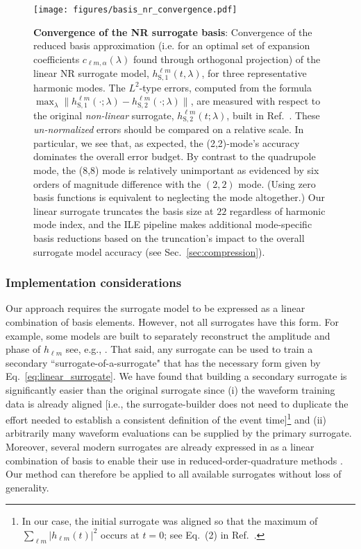\documentclass[aps,prd,nofootinbib,showpacs,amssymb,twocolumn]{revtex4}
\begin{document}
\begin{figure}
\texttt{[image: figures/basis\_nr\_convergence.pdf]}
\caption{\label{fig:basis_convergences}\textbf{Convergence of the NR surrogate basis}: Convergence of the reduced basis approximation (i.e. for an optimal set of expansion coefficients $c_{\ell m, \alpha}(\lambda)$ found through orthogonal projection)
of the linear NR surrogate model, $h^{\ell m}_\mathrm{S,1}(t,\lambda)$, for 
three representative harmonic modes. 
The $L^2$-type errors, computed from the formula $\max_{\lambda} \| h^{\ell m}_\mathrm{S,1}(\cdot; \lambda) - h^{\ell m}_\mathrm{S,2}(\cdot; \lambda)\|$, are measured with respect to the original {\em non-linear} surrogate, $h^{\ell m}_\mathrm{S,2}(t;\lambda)$, built in Ref.~\cite{gwastro-approx-ROMNR-Blackman2015}. These {\em un-normalized} errors should be compared on a relative scale. In
particular, we see that, as expected, the (2,2)-mode's accuracy dominates the overall error budget. 
By contrast to the quadrupole mode, the (8,8) mode is relatively unimportant as evidenced by six orders of magnitude difference with the $(2,2)$ mode. (Using zero basis functions is equivalent to neglecting the mode altogether.) Our linear surrogate truncates the basis size at $22$ regardless of harmonic mode index, and the ILE pipeline makes additional mode-specific basis reductions based on the truncation's impact to the overall surrogate model accuracy (see Sec.~\ref{sec:compression}).
}
\end{figure}

\subsubsection{Implementation considerations}

%
%
Our approach requires the surrogate model
to be expressed as a linear combination of basis elements.
%
%
%
%
%
However, not all surrogates have this form. For example, some models are built to separately reconstruct the amplitude and
phase of $h_{\ell m}$ see, e.g., \cite{2014CQGra..31s5010P,gwastro-approx-ROMNR-Blackman2015}. 
%
%
%
That said, any surrogate can be used to train a secondary ``surrogate-of-a-surrogate"
that has the necessary form given by Eq.~\eqref{eq:linear_surrogate}.
%
We have found that building a secondary surrogate is significantly easier than the original surrogate since (i) the
waveform training data is already aligned [i.e., the surrogate-builder does not need to duplicate the effort needed to
  establish a consistent definition of the event time]\footnote{In our case, the initial surrogate was aligned so that the maximum of $\sum_{\ell m}|h_{\ell m}(t)|^2$ occurs at $t=0$; see Eq.~(2) in Ref.~\cite{gwastro-approx-ROMNR-Blackman2015}.} and (ii) arbitrarily many waveform evaluations can be supplied by the primary
surrogate.  Moreover,
several modern surrogates are already expressed in 
as a linear combination of basis to enable their use in reduced-order-quadrature
methods \cite{2016PhRvD..94d4031S}.   Our method can therefore be applied to all available surrogates without loss of generality.
%
\end{document}
